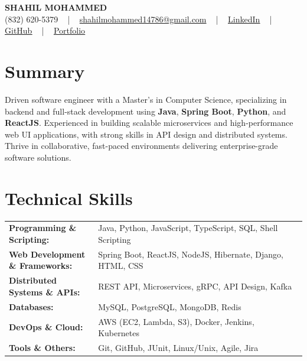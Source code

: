 \documentclass[letterpaper,11pt]{article}
\begin{document}
\begin{center}
    {\fontsize{14pt}{12pt}\selectfont \textbf{\MakeUppercase{Shahil Mohammed}}}\\ \vspace{2pt}
    \fontsize{10pt}{12pt}\selectfont (832) 620-5379 ~ | ~ \href{mailto:shahilmohammed14786@gmail.com}{shahilmohammed14786@gmail.com} ~ | ~  
    \href{https://www.linkedin.com/in/shahil-mohammed-9652931a1/}{\color{blue}\underline{LinkedIn}}  ~ | ~ 
    \href{https://github.com/freakbeast14}{\color{blue}\underline{GitHub}} ~ | ~ 
    \href{https://shahil-mohammed.netlify.app/}{\color{blue}\underline{Portfolio}}
    \vspace{-8pt}
\end{center}

\section{Summary}
\fontsize{9pt}{10pt}\selectfont
Driven software engineer with a Master’s in Computer Science, specializing in backend and full-stack development using \textbf{Java}, \textbf{Spring Boot}, \textbf{Python}, and \textbf{ReactJS}. Experienced in building scalable microservices and high-performance web UI applications, with strong skills in API design and distributed systems. Thrive in collaborative, fast-paced environments delivering enterprise-grade software solutions.
 \vspace{-5pt}
 
\section{Technical Skills}
        \vspace{-14pt}
        \begin{table}[h]
            \fontsize{9pt}{10pt}\selectfont
            \begin{tabular}{p{0.3\linewidth} p{0.7\linewidth}}
                \textbf{Programming \& Scripting:} & Java, Python, JavaScript, TypeScript, SQL, Shell Scripting \\
                \textbf{Web Development \& Frameworks:} & Spring Boot, ReactJS, NodeJS, Hibernate, Django, HTML, CSS \\
                \textbf{Distributed Systems \& APIs:} & REST API, Microservices, gRPC, API Design, Kafka \\
                \textbf{Databases:} & MySQL, PostgreSQL, MongoDB, Redis \\
                \textbf{DevOps \& Cloud:} & AWS (EC2, Lambda, S3), Docker, Jenkins, Kubernetes \\
                \textbf{Tools \& Others:} & Git, GitHub, JUnit, Linux/Unix, Agile, Jira \\
            \end{tabular}
        \end{table}
 \vspace{-15pt}
 
\end{document}
